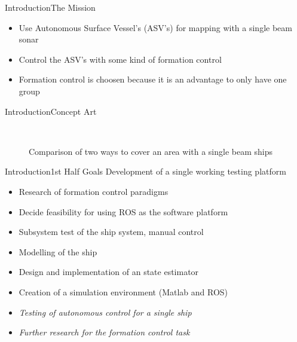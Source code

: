 \documentclass[10pt,handout]{beamer}
\begin{document}
\begin{frame}{Introduction}{The Mission}
\begin{itemize}
\item Use Autonomous Surface Vessel's (ASV's) for mapping with a single beam sonar
\item Control the ASV's with some kind of formation control
\item Formation control is choosen because it is an advantage to only have one group
\end{itemize}
\end{frame}

\begin{frame}{Introduction}{Concept Art}
\begin{figure}
  \centering
  \ %
  \caption{Comparison of two ways to cover an area with a single beam ships}
  \label{fig:concept-art}
\end{figure}
\end{frame}

\begin{frame}{Introduction}{1st Half Goals}
Development of a single working testing platform
  \begin{itemize}
  \item Research of formation control paradigms
  \item Decide feasibility for using ROS as the software platform
  \item Subsystem test of the ship system, manual control
  \item Modelling of the ship
  \item Design and implementation of an state estimator
  \item Creation of a simulation environment (Matlab and ROS)
  \item \textit{Testing of autonomous control for a single ship}
  \item \textit{Further research for the formation control task}
  \end{itemize}
\end{frame}
\end{document}
